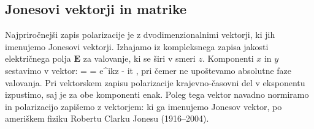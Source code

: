 \subsection*{Jonesovi vektorji in matrike}
Najpriročnejši zapis polarizacije je z dvodimenzionalnimi 
vektorji, ki jih imenujemo Jonesovi vektorji.  Izhajamo iz kompleksnega zapisa
jakosti električnega polja $\mathbf{E}$ za valovanje, ki se širi v smeri $z$.
Komponenti $x$ in $y$ sestavimo v vektor:
\beq
{} = 
= e^{ikz - i\omega t} 
\!\!,
\label{eq:03_41}
\eeq
pri čemer ne upoštevamo absolutne faze valovanja. 
Pri vektorskem zapisu polarizacije krajevno-časovni del v eksponentu izpustimo, saj 
je za obe komponenti enak. Poleg tega vektor navadno normiramo in 
polarizacijo zapišemo z vektorjem:
ki ga imenujemo Jonesov vektor, po ameriškem fiziku Robertu Clarku Jonesu (1916--2004).

